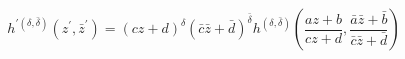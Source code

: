 \begin{equation}
h^{'(\delta,\bar{\delta})}(z^{'},{\bar{z}}^{'})= (cz+d)^{\delta}(\bar{c}
\bar{z}+\bar{d})^{\bar{\delta}}h^{(\delta,\bar{\delta})}(\frac{az+b}{cz+d},\frac{\bar{a}
\bar{z}+\bar{b}}{\bar{c} \bar{z}+\bar{d}})
\end{equation}


